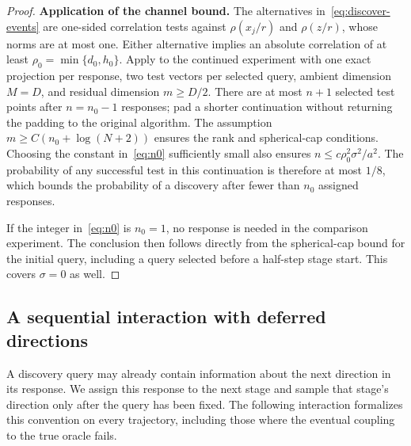 \documentclass[11pt]{article}
\theoremstyle{definition}
\theoremstyle{remark}
\begin{document}
\begin{proof}
\noindent\textbf{Application of the channel bound.}
The alternatives in~\eqref{eq:discover-events} are one-sided correlation
tests against $\rho(x_j/r)$ and $\rho(z/r)$, whose norms are at most one.
Either alternative implies an absolute correlation of at least
$\rho_0=\min\{d_0,h_0\}$.  Apply  to the continued
experiment with one exact projection per response, two test vectors per
selected query, ambient dimension $M=D$, and residual dimension $m\ge D/2$.
There are at most $n+1$ selected test points after $n=n_0-1$ responses;
pad a shorter continuation without returning the padding to the original
algorithm.  The assumption $m\ge C(n_0+\log(N+2))$ ensures the rank and
spherical-cap conditions.  Choosing the constant in~\eqref{eq:n0} sufficiently
small also ensures $n\le c\rho_0^2\sigma^2/a^2$.  The probability of any
successful test in this continuation is therefore at most $1/8$, which bounds
the probability of a discovery after fewer than $n_0$ assigned responses.

If the integer in~\eqref{eq:n0} is $n_0=1$, no response is needed in the
comparison experiment.  The conclusion then follows directly from the
spherical-cap bound for the initial query, including a query selected before a
half-step stage start.  This covers $\sigma=0$ as well.
\end{proof}

\subsection{A sequential interaction with deferred directions}

A discovery query may already contain information about the next direction in
its response.  We assign this response to the next stage and sample that
stage's direction only after the query has been fixed.  The following
interaction formalizes this convention on every trajectory, including those
where the eventual coupling to the true oracle fails.
\end{document}
